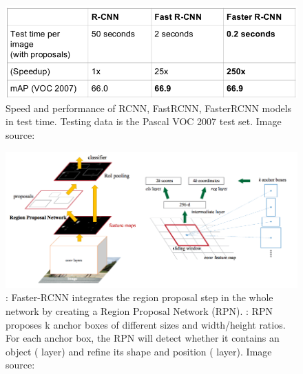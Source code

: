 \begin{figure}[tb]
	\centering
	\includegraphics[width=0.8\hsize]{./figures/rcnnCompair}
	\caption{Speed and performance of RCNN, FastRCNN, FasterRCNN models in test time. Testing data is the Pascal VOC 2007 test set. Image source: \cite{cs231n}}
	\label{fig:rcnnCompair}
\end{figure}

\begin{figure}[tb]
	\centering
	\includegraphics[width=1.0\hsize]{./figures/fasterRCNNfull}
	\caption{: Faster-RCNN integrates the region proposal step in the whole network by creating a Region Proposal Network (RPN). : RPN proposes k anchor boxes of different sizes and width/height ratios. For each anchor box, the RPN will detect whether it contains an object ( layer) and refine its shape and position ( layer). Image source: \cite{DBLP:journals/corr/RenHG015}}
	\label{fig:fasterRCNNfull}
\end{figure}


